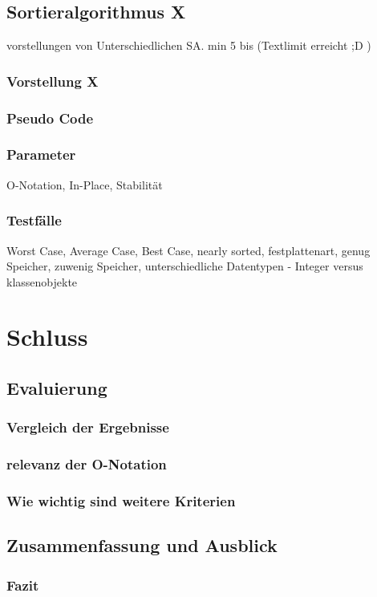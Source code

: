 \documentclass{article}
\begin{document}
\subsection{Sortieralgorithmus X}
vorstellungen von Unterschiedlichen SA. min 5 bis (Textlimit erreicht ;D  )
\subsubsection{Vorstellung X}
\subsubsection{Pseudo Code}
\subsubsection{Parameter}
O-Notation, In-Place, Stabilität
\subsubsection{Testfälle}
Worst Case, Average Case, Best Case, nearly sorted, festplattenart, genug Speicher, zuwenig Speicher, unterschiedliche Datentypen - Integer versus klassenobjekte

\section{Schluss}
\subsection{Evaluierung}
\subsubsection{Vergleich der Ergebnisse}
\subsubsection{relevanz der O-Notation}
\subsubsection{Wie wichtig sind weitere Kriterien}

\subsection{Zusammenfassung und Ausblick}
\subsubsection{Fazit}
\end{document}
